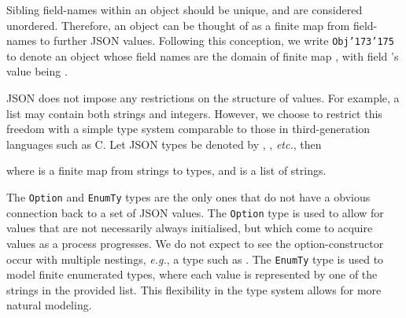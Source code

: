 \documentclass{llncs}
\newcommand{\eg}{\textit{e.g.}}
\newcommand{\etc}{\textit{etc.}}
\newcommand{\lb}{\texttt{\char'173}} \newcommand{\rb}{\texttt{\char'175}} \newcommand{\wrt}{wrt.\xspace}
\begin{document}
\newcommand{\obj}[1]{\texttt{Obj}\lb#1\rb}
Sibling field-names within an object should be unique, and are considered unordered.
Therefore, an object can be thought of as a finite map from field-names to further JSON values.
Following this conception, we write \obj{} to denote an object whose field names are the domain of finite map , with field 's value being .


\newcommand{\intty}{\texttt{Integer}}
\newcommand{\boolty}{\texttt{Bool}}
\newcommand{\stringty}{\texttt{String}}
\newcommand{\listtyopname}{\texttt{List}}
\newcommand{\listty}[1]{\listtyopname[#1]}
\newcommand{\optiontyopname}{\texttt{Option}}
\newcommand{\optionty}[1]{\optiontyopname[#1]}
\newcommand{\objtyopname}{\texttt{ObjTy}}
\newcommand{\objty}[1]{\objtyopname\lb#1\rb}
\newcommand{\enumtyopname}{\texttt{EnumTy}}
\newcommand{\enumty}[1]{\enumtyopname[#1]}
\newcommand{\dom}{\mathrm{dom}}

JSON does not impose any restrictions on the structure of values.  For example, a
list may contain both strings and integers.  However, we choose to restrict this
freedom with a simple type system comparable to those in third-generation languages
such as C.  Let JSON types be denoted by , ,  \etc, then
{\small

}
where  is a finite map from strings to types, and  is a list of strings.

The \optiontyopname{} and \enumtyopname{} types are the only ones that do not have a obvious connection back to a set of JSON values.
The \optiontyopname{} type is used to allow for values that are not necessarily always initialised, but which come to acquire values as a process progresses.
We do not expect to see the option-constructor occur with multiple nestings, \eg, a type such as .
The \enumtyopname{} type is used to model finite enumerated types, where each value is represented by one of the strings in the provided list.
This flexibility in the type system allows for more natural modeling.
\end{document}

